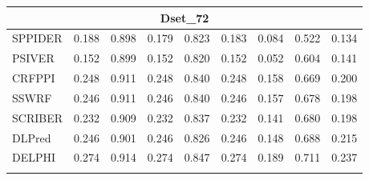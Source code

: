 \documentclass[a0,portrait]{a0poster}
\begin{document}
\begin{multicols}{2}
\begin{mdframed}[linewidth=7pt]
\begin{minipage}[b]{0.48\linewidth}
{\begin{tabular}{@{}l@{\ }*{8}{r}}
    \hline
    \multicolumn{9}{c}{Dset\_72} \\
    \hline
    SPPIDER & \cellcolor[rgb]{ .8,  .851,  .773}0.188 & \cellcolor[rgb]{ .988,  .988,  1}0.898 & \cellcolor[rgb]{ .843,  .882,  .827}0.179 & \cellcolor[rgb]{ .925,  .945,  .925}0.823 & \cellcolor[rgb]{ .824,  .867,  .8}0.183 & \cellcolor[rgb]{ .835,  .878,  .816}0.084 & \cellcolor[rgb]{ .988,  .988,  1}0.522 & \cellcolor[rgb]{ .988,  .988,  1}0.134 \\
    PSIVER & \cellcolor[rgb]{ .988,  .988,  1}0.152 & \cellcolor[rgb]{ .937,  .953,  .937}0.899 & \cellcolor[rgb]{ .988,  .988,  1}0.152 & \cellcolor[rgb]{ .988,  .988,  1}0.820 & \cellcolor[rgb]{ .988,  .988,  1}0.152 & \cellcolor[rgb]{ .988,  .988,  1}0.052 & \cellcolor[rgb]{ .706,  .784,  .659}0.604 & \cellcolor[rgb]{ .941,  .957,  .945}0.141 \\
    CRFPPI & \cellcolor[rgb]{ .475,  .616,  .384}0.248 & \cellcolor[rgb]{ .478,  .62,  .388}0.911 & \cellcolor[rgb]{ .475,  .616,  .384}0.248 & \cellcolor[rgb]{ .49,  .627,  .4}0.840 & \cellcolor[rgb]{ .475,  .616,  .384}0.248 & \cellcolor[rgb]{ .478,  .616,  .384}0.158 & \cellcolor[rgb]{ .475,  .616,  .384}0.669 & \cellcolor[rgb]{ .565,  .682,  .49}0.200 \\
    SSWRF & \cellcolor[rgb]{ .482,  .624,  .392}0.246 & \cellcolor[rgb]{ .486,  .624,  .396}0.911 & \cellcolor[rgb]{ .482,  .624,  .392}0.246 & \cellcolor[rgb]{ .498,  .635,  .412}0.840 & \cellcolor[rgb]{ .482,  .624,  .392}0.246 & \cellcolor[rgb]{ .486,  .624,  .396}0.157 & \cellcolor[rgb]{ .447,  .596,  .349}0.678 & \cellcolor[rgb]{ .576,  .69,  .506}0.198 \\
    SCRIBER & \cellcolor[rgb]{ .557,  .675,  .482}0.232 & \cellcolor[rgb]{ .553,  .671,  .475}0.909 & \cellcolor[rgb]{ .557,  .675,  .482}0.232 & \cellcolor[rgb]{ .569,  .686,  .498}0.837 & \cellcolor[rgb]{ .557,  .675,  .482}0.232 & \cellcolor[rgb]{ .557,  .678,  .482}0.141 & \cellcolor[rgb]{ .439,  .592,  .341}0.680 & \cellcolor[rgb]{ .576,  .69,  .506}0.198 \\
    DLPred & \cellcolor[rgb]{ .482,  .62,  .392}0.246 & \cellcolor[rgb]{ .859,  .894,  .843}0.901 & \cellcolor[rgb]{ .482,  .62,  .388}0.246 & \cellcolor[rgb]{ .855,  .894,  .839}0.826 & \cellcolor[rgb]{ .482,  .62,  .388}0.246 & \cellcolor[rgb]{ .529,  .655,  .447}0.148 & \cellcolor[rgb]{ .412,  .569,  .306}0.688 & \cellcolor[rgb]{ .467,  .612,  .373}0.215 \\
    DELPHI & \cellcolor[rgb]{ .329,  .51,  .208}0.274 & \cellcolor[rgb]{ .329,  .51,  .208}0.914 & \cellcolor[rgb]{ .329,  .51,  .208}0.274 & \cellcolor[rgb]{ .329,  .51,  .208}0.847 & \cellcolor[rgb]{ .329,  .51,  .208}0.274 & \cellcolor[rgb]{ .329,  .51,  .208}0.189 & \cellcolor[rgb]{ .329,  .51,  .208}0.711 & \cellcolor[rgb]{ .329,  .51,  .208}0.237 \\
\label{tab_ds186_164_72}
    \end{tabular}}
    \end{minipage}
\end{mdframed}


\end{multicols}
\end{document}
